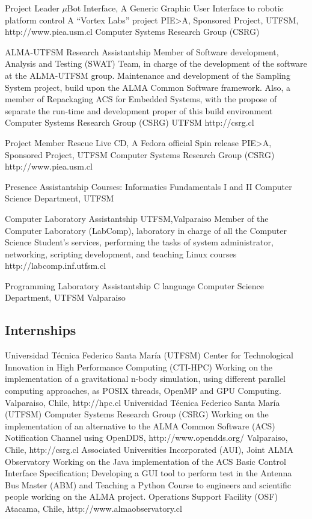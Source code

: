 \documentclass[11pt,a4paper]{moderncv}
\begin{document}
	{Project Leader}
	{$\mu$Bot Interface, A Generic Graphic User Interface to robotic platform control}
	{A ``Vortex Labs'' project}
	{PIE>A, Sponsored Project, UTFSM, http://www.piea.usm.cl}
	{Computer Systems Research Group (CSRG)}

	{ALMA-UTFSM Research Assistantship}
	{Member of Software development, Analysis and Testing (SWAT) Team, in charge of the development of the software at the ALMA-UTFSM group. 
	Maintenance and development of the Sampling System project, build upon the ALMA Common Software framework.
	Also, a member of Repackaging ACS for Embedded Systems, with the propose of separate the run-time and development
	proper of this build environment}
	{Computer Systems Research Group (CSRG)}
	{UTFSM}
	{http://csrg.cl}

	{Project Member}
	{Rescue Live CD, A Fedora official Spin release}
	{PIE>A, Sponsored Project, UTFSM}
	{Computer Systems Research Group (CSRG)}
	{http://www.piea.usm.cl}

	{Presence Assistantship}
	{Courses: Informatics Fundamentals  I and II}
	{Computer Science Department, UTFSM}
	{}{}

	{Computer Laboratory Assistantship}
	{UTFSM,Valparaiso}
	{Member of the Computer Laboratory (LabComp), laboratory in charge of all the Computer Science Student's services, performing the tasks of system administrator, networking, scripting development, and teaching Linux courses}
	{http://labcomp.inf.utfsm.cl}{}

	{Programming Laboratory Assistantship}
	{C language}
	{Computer Science Department, UTFSM}
	{Valparaiso}
	{}

\subsection{Internships}

	{Universidad Técnica Federico Santa María (UTFSM)}
	{Center for Technological Innovation in High Performance Computing (CTI-HPC)}
	{Working on the implementation of a gravitational n-body simulation, using different parallel computing approaches, as POSIX threads, OpenMP and GPU Computing.}
	{Valparaiso, Chile, http://hpc.cl}
	{Universidad Técnica Federico Santa María (UTFSM)}
	{Computer Systems Research Group (CSRG)}
	{Working on the implementation of an alternative to the ALMA Common Software (ACS) Notification Channel using OpenDDS, http://www.opendds.org/}
	{Valparaiso, Chile, http://csrg.cl}
	{Associated Universities Incorporated (AUI), Joint ALMA Observatory}
	{Working on the Java implementation of the ACS Basic Control Interface Specification; Developing a GUI tool to perform test in the Antenna Bus Master (ABM) and Teaching a Python Course to engineers and scientific people working on the ALMA project.}
	{Operations Support Facility (OSF)}
	{Atacama, Chile, http://www.almaobservatory.cl}
\end{document}
